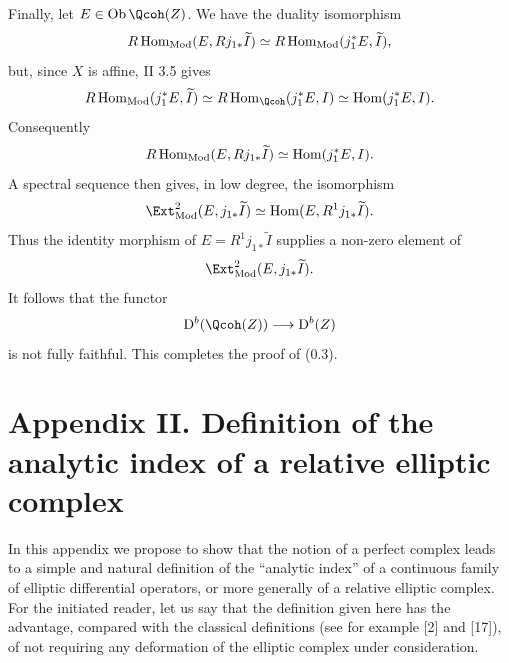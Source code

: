 \documentclass[11pt]{article}
\newcommand{\Parf}{\operatorname{Parf}}
\providecommand{\cF}{\mathscr F}
\providecommand{\Coker}{\operatorname{Coker}}
\providecommand{\Ker}{\operatorname{Ker}}
\providecommand{\cO}{\mathcal O}
\begin{document}
Finally, let $E\in\Ob\Qcoh(Z)$. We have the duality isomorphism
\[
 R\Hom_{\Mod}(E,Rj_{1*}\widetilde I)
 \simeq R\Hom_{\Mod}(j_1^*E,\widetilde I),
\]
but, since $X$ is affine, II 3.5 gives
\[
 R\Hom_{\Mod}(j_1^*E,\widetilde I)
 \simeq R\Hom_{\Qcoh}(j_1^*E,I)
 \simeq \Hom(j_1^*E,I).
\]
Consequently
\[
 R\Hom_{\Mod}(E,Rj_{1*}\widetilde I)
 \simeq \Hom(j_1^*E,I).
\]
A spectral sequence then gives, in low degree, the isomorphism
\[
 \Ext^2_{\Mod}(E,j_{1*}\widetilde I)
 \simeq \Hom(E,R^1j_{1*}\widetilde I).
\]
Thus the identity morphism of $E=R^1j_{1*}\widetilde I$ supplies a non-zero element of
\[
 \Ext^2_{\Mod}(E,j_{1*}\widetilde I).
\]
It follows that the functor
\[
 \mathrm D^b(\Qcoh(Z))\longrightarrow \mathrm D^b(Z)
\]
is not fully faithful. This completes the proof of (0.3).




\providecommand{\Diff}{\operatorname{Diff}}
\providecommand{\Hom}{\operatorname{Hom}}
\providecommand{\im}{\operatorname{Im}}
\providecommand{\ind}{\operatorname{ind}}
\providecommand{\Cone}{\operatorname{Cone}}
\providecommand{\Loclib}{\operatorname{Loclib}}
\providecommand{\ob}{\operatorname{ob}}
\providecommand{\Parf}{\operatorname{Parf}}
\providecommand{\Mod}{\operatorname{Mod}}
\providecommand{\Ob}{\operatorname{Ob}}
\providecommand{\Coker}{\operatorname{Coker}}
\providecommand{\Ker}{\operatorname{Ker}}
\providecommand{\cH}{\mathcal H}
\providecommand{\cO}{\mathcal O}
\providecommand{\cP}{\mathcal P}
\providecommand{\cE}{\mathcal E}
\providecommand{\cF}{\mathcal F}
\providecommand{\cG}{\mathcal G}
\providecommand{\cD}{\mathcal D}
\providecommand{\cT}{\mathcal T}
\providecommand{\cL}{\mathcal L}
\providecommand{\RHom}{\mathrm R\!\operatorname{Hom}}
\providecommand{\RGamma}{\mathrm R\Gamma}
\providecommand{\dlim}{\operatorname*{lim}}
\providecommand{\plim}{\operatorname*{lim}}


\newpage
\section*{Appendix II. Definition of the analytic index of a relative elliptic complex}

In this appendix we propose to show that the notion of a perfect complex leads to a simple and natural definition of the ``analytic index'' of a continuous family of elliptic differential operators, or more generally of a relative elliptic complex. For the initiated reader, let us say that the definition given here has the advantage, compared with the classical definitions (see for example [2] and [17]), of not requiring any deformation of the elliptic complex under consideration.
\end{document}

